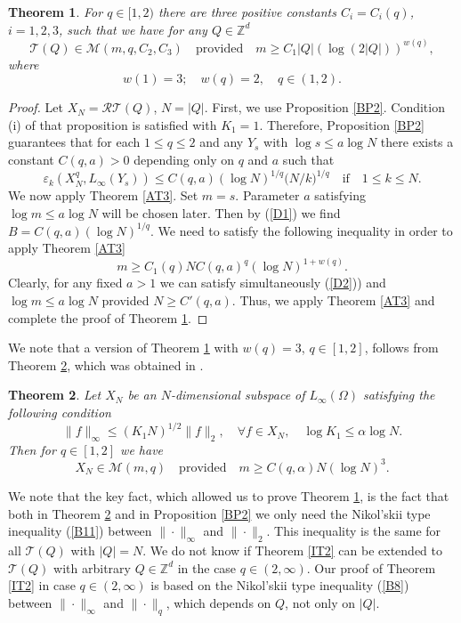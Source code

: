 \documentclass[12pt]{article}
\def \Tr{\mathcal T}
\def \cR{\mathcal R}
\def \cM{\mathcal M}
\def\Z{\mathbb Z}
\def \e{\varepsilon}
\newtheorem{Theorem}{Theorem}[section]
\numberwithin{equation}{section}
\newcommand{\be}{\begin{equation}}
\newcommand{\ee}{\end{equation}}
\begin{document}
\begin{Theorem}\label{DT1} For $q\in [1,2)$  there are three positive constants\newline 
$C_i=C_i(q)$, $i=1,2,3$, such that we have for any $Q\in \Z^d$
$$
\Tr(Q) \in \cM(m,q,C_2,C_3)\quad \text{provided}\quad m\ge C_1|Q|(\log (2|Q|))^{w(q) },
$$
 where
$$
w(1) = 3;\quad w(q) = 2, \quad q\in (1,2).
$$
\end{Theorem}
\begin{proof} Let $X_N=\cR\Tr(Q)$, $N=|Q|$. First, we use Proposition \ref{BP2}. Condition (i) of that proposition is satisfied with $K_1=1$. Therefore, Proposition \ref{BP2} guarantees that for  each $1\leq q\leq 2$ and any $Y_s$ with $\log s \le a \log N$ there exists a constant $C(q,a)>0$ depending only on $q$ and $a$ such that
\begin{equation}\label{D1}
\e_k (X_N^q, L_\infty(Y_s)) \leq C(q,a) (\log N)^{1/q} 
	\bigl(N/k\bigr)^{1/q} \quad \text{if} \quad 1\leq k\leq N.
\end{equation}
We now apply Theorem \ref{AT3}. Set $m=s$. Parameter $a$ satisfying $\log m \le a\log N$ will be chosen later. Then by (\ref{D1}) we find $B=C(q,a) (\log N)^{1/q}$. We need to satisfy the following inequality in order to apply Theorem \ref{AT3}
\be\label{D2}
m\ge C_1(q)N C(q,a)^q (\log N)^{1+w(q)}.
\ee
Clearly, for any fixed $a>1$ we can satisfy simultaneously (\ref{D2})) and $\log m \le a\log N$
provided $N\ge C'(q,a)$. Thus, we apply Theorem \ref{AT3} and complete the proof of Theorem \ref{DT1}. 
\end{proof}

We note that a version of Theorem \ref{DT1} with $w(q) =3$, $q\in [1,2]$, follows from Theorem 
\ref{DT2}, which was obtained in \cite{DPSTT2}.

 \begin{Theorem}\label{DT2} Let $X_N$ be an $N$-dimensional subspace of $L_\infty(\Omega)$ satisfying the following condition
$$
\|f\|_\infty\le (K_1N)^{1/2}\|f\|_2, \quad \forall f\in X_N,\quad \log K_1 \le \alpha \log N.
$$
Then for $q\in [1,2]$ we have
$$
X_N \in \cM(m,q)\quad \text{provided}\quad m\ge C(q,\alpha)N(\log N)^3.
$$ 
\end{Theorem}

 We note that the key fact, which allowed us to prove Theorem \ref{DT1}, is the fact that both in Theorem  \ref{DT2} and in Proposition \ref{BP2} we only need the Nikol'skii type inequality (\ref{B11}) between $\|\cdot\|_\infty$ and $\|\cdot\|_2$. This inequality is the same for all $\Tr(Q)$ with $|Q|=N$. We do not know if Theorem \ref{IT2} can be extended to $\Tr(Q)$ with arbitrary 
 $Q\in \Z^d$ in the case $q\in (2,\infty)$. Our proof of Theorem \ref{IT2} in case $q\in (2,\infty)$ is based on the Nikol'skii type inequality (\ref{B8}) between $\|\cdot\|_\infty$ and $\|\cdot\|_q$, which depends on $Q$, not only on $|Q|$. 
 
\end{document}
